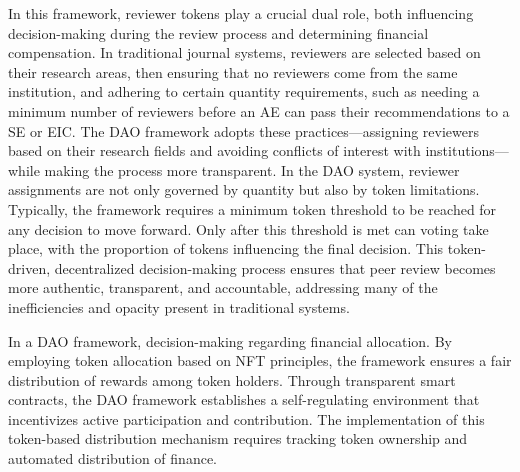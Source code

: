 \documentclass[lettersize,journal]{IEEEtran}
\begin{document}
In this framework, reviewer tokens play a crucial dual role, both influencing decision-making during the review process and determining financial compensation. In traditional journal systems, reviewers are selected based on their research areas, then ensuring that no reviewers come from the same institution, and adhering to certain quantity requirements, such as needing a minimum number of reviewers before an AE can pass their recommendations to a SE or EIC. The DAO framework adopts these practices—assigning reviewers based on their research fields and avoiding conflicts of interest with institutions—while making the process more transparent. In the DAO system, reviewer assignments are not only governed by quantity but also by token limitations. Typically, the framework requires a minimum token threshold to be reached for any decision to move forward. Only after this threshold is met can voting take place, with the proportion of tokens influencing the final decision. This token-driven, decentralized decision-making process ensures that peer review becomes more authentic, transparent, and accountable, addressing many of the inefficiencies and opacity present in traditional systems.



In a DAO framework, decision-making regarding financial allocation. By employing token allocation based on NFT principles, the framework ensures a fair distribution of rewards among token holders. Through transparent smart contracts, the DAO framework establishes a self-regulating environment that incentivizes active participation and contribution. The implementation of this token-based distribution mechanism requires tracking token ownership and automated distribution of finance.
\end{document}

